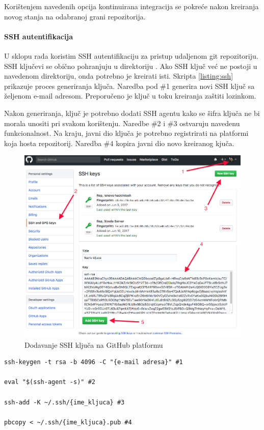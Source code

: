 \documentclass[times, utf8, diplomski, numeric]{fer}
\begin{document}
Korištenjem navedenih opcija kontinuirana integracija se pokreće nakon kreiranja novog stanja na odabranoj grani repozitorija.

\paragraph{SSH autentifikacija}

U sklopu rada koristim SSH autentifikaciju za pristup udaljenom git repozitoriju. SSH ključevi se obično pohranjuju u direktoriju . Ako SSH ključ već ne postoji u navedenom direktoriju, onda potrebno je kreirati isti. Skripta \ref{listing:ssh} prikazuje proces generiranja ključa. Naredba pod \#1 generira novi SSH ključ sa željenom e-mail adresom. Preporučeno je ključ u toku kreiranja zaštiti lozinkom.

Nakon generiranja, ključ je potrebno dodati SSH agentu kako se šifra ključa ne bi morala unositi pri svakom korištenju. Naredbe \#2 i \#3 ostvaruju navedenu funkcionalnost. Na kraju, javni dio ključa je potrebno registrirati na platformi koja hosta repozitorij. Naredba \#4 kopira javni dio novo kreiranog kjuča.

\begin{figure}[b!]
\centering
\includegraphics[scale=0.3]{GitHubSSH}
\caption{Dodavanje SSH ključa na GitHub platformu}
\label{fig:GitHubSSH}
\end{figure}

\begin{lstlisting}[caption=Postavljanje SSH autentifikacije, label=listing:ssh]
ssh-keygen -t rsa -b 4096 -C "{e-mail adresa}" #1

eval "$(ssh-agent -s)" #2

ssh-add -K ~/.ssh/{ime_kljuca} #3

pbcopy < ~/.ssh/{ime_kljuca}.pub #4
\end{lstlisting}
\end{document}

